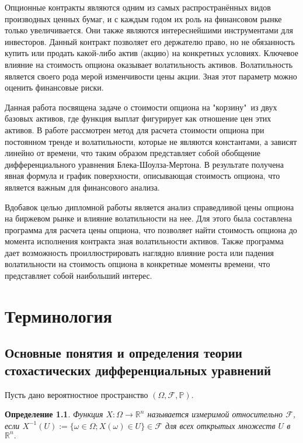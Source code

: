 \documentclass[a4paper, 12pt]{extreport}
\newtheorem{definition}{Определение}
\numberwithin{equation}{section}
\begin{document}
\thispagestyle{empty}

	
	Опционные контракты являются одним из самых распространённых видов производных ценных бумаг, и с каждым годом их роль на финансовом рынке только увеличивается. Они также являются интереснейшими инструментами для инвесторов. Данный контракт позволяет его держателю право, но не обязанность купить или продать какой-либо актив (акцию) на конкретных условиях. Ключевое влияние на стоимость опциона оказывает волатильность активов. Волатильность является своего рода мерой изменчивости цены акции. Зная этот параметр можно оценить финансовые риски. 


	Данная работа посвящена задаче о стоимости опциона на "корзину"\ из двух базовых активов, где функция выплат фигурирует как отношение цен этих активов. В работе рассмотрен метод для расчета стоимости опциона при постоянном тренде и волатильности, которые не являются константами, а зависят линейно от времени, что таким образом представляет собой обобщение дифференциального уравнения Блека-Шоулза-Мертона. В результате получена явная формула и график поверхности, описывающая стоимость опциона, что является важным для финансового анализа.


	Вдобавок целью дипломной работы является анализ справедливой цены опциона на биржевом рынке и влияние волатильности на нее. Для этого была составлена программа для расчета цены опциона, что позволяет найти стоимость опциона до момента исполнения контракта зная волатильности активов. Также программа дает возможность проиллюстрировать наглядно влияние роста или падения волатильности на стоимость опциона в конкретные моменты времени, что представляет собой наибольший интерес.


	
	\newpage
	
	\chapter{Терминология}
	\section{ Основные понятия и определения теории стохастических дифференциальных уравнений}

	
	
	Пусть дано вероятностное пространство $(\Omega,\mathcal{F},\mathbb{P}).$
	
	\begin{definition}
		Функция  $X : \Omega \to \mathbb{R}^n $ называется  измеримой относительно $\mathcal{F}$, если $X^{-1}(U) := \{\omega \in \Omega; X(\omega) \in U\} \in \mathcal{F}$ для всех открытых множеств $U$ в $\mathbb{R}^n . $
	\end{definition}
\end{document}
